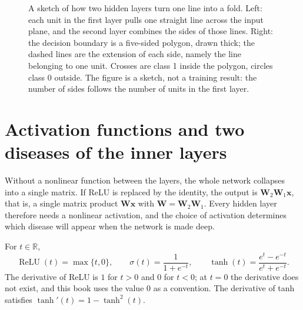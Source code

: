 \begin{figure}[htbp]
\caption{A sketch of how two hidden layers turn one line into a fold. Left: each unit in the
first layer pulls one straight line across the input plane, and the second layer combines the
sides of those lines. Right: the decision boundary is a five-sided polygon, drawn thick; the
dashed lines are the extension of each side, namely the line belonging to one unit. Crosses are
class 1 inside the polygon, circles class 0 outside. The figure is a sketch, not a training
result: the number of sides follows the number of units in the first layer.}
\label{fig:dua-lapis}
\end{figure}


\section{Activation functions and two diseases of the inner layers}

Without a nonlinear function between the layers, the whole network collapses into a single
matrix. If ReLU is replaced by the identity, the output is
$\mathbf{W}_{2}\mathbf{W}_{1}\mathbf{x}$, that is, a single matrix product
$\mathbf{W}\mathbf{x}$ with $\mathbf{W}=\mathbf{W}_{2}\mathbf{W}_{1}$. Every hidden layer
therefore needs a nonlinear activation, and the choice of activation determines which disease
will appear when the network is made deep.


\begin{definisi}
For $t\in\mathbb{R}$,
\[
  \operatorname{ReLU}(t)=\max\{t,0\},\qquad
  \sigma(t)=\frac{1}{1+e^{-t}},\qquad
  \tanh(t)=\frac{e^{t}-e^{-t}}{e^{t}+e^{-t}} .
\]
The derivative of ReLU is $1$ for $t>0$ and $0$ for $t<0$; at $t=0$ the derivative does not
exist, and this book uses the value $0$ as a convention. The derivative of tanh satisfies
$\tanh'(t)=1-\tanh^{2}(t)$.
\end{definisi}

